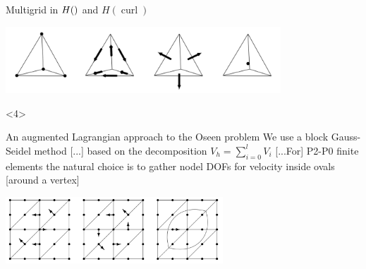 \documentclass[presentation,aspectratio=43,10pt]{beamer}
\let\div\relax
\DeclareMathOperator{\div}{div}
\DeclareMathOperator{\curl}{curl}
\begin{document}
\begin{frame}
\begin{onlyenv}
\begin{block}{Multigrid in $H(\div)$ and $H(\curl)$}
      \begin{center}
        \includegraphics[height=2.5cm]{arnold}
      \end{center}
      \begin{flushright}
        \textcite{Arnold:2000} \hspace{4em}
      \end{flushright}
    \end{block}
  \end{onlyenv}

  \begin{onlyenv}<4>
    \begin{block}{An augmented Lagrangian approach to the Oseen problem}
      We use a block Gauss-Seidel method [...] based on the
      decomposition $V_h = \sum_{i=0}^l V_i$ [...For] P2-P0 finite
      elements the natural choice is to gather nodel DOFs for velocity
      inside ovals [around a vertex]

      \begin{center}
        \includegraphics[height=2.5cm]{benzi}
      \end{center}
      \begin{flushright}
        \textcite{Benzi:2006} \hspace{4em}
      \end{flushright}
    \end{block}
  \end{onlyenv}
\end{frame}
\end{document}
